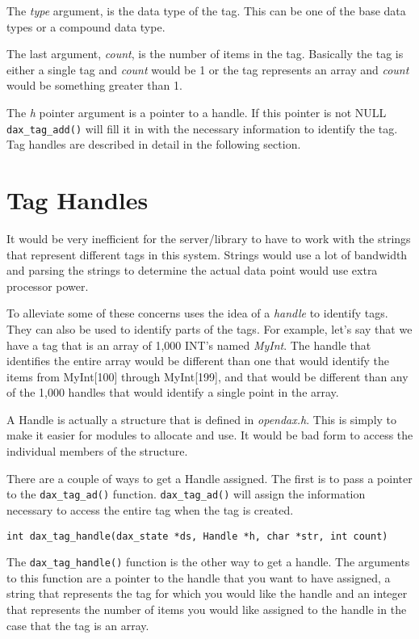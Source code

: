 The \emph{type} argument, is the data type of the tag.  This can be one of the base data types or a compound data type.

The  last argument, \emph{count}, is the number of items in the tag.  Basically the tag is either a single tag and \emph{count} would be 1 or the tag represents an array and \emph{count} would be something greater than 1.

The \emph{h} pointer argument is a pointer to a handle.  If this pointer is not NULL \verb|dax_tag_add()| will fill it in with the necessary information to identify the tag.  Tag handles are described in detail in the following section.

\section{Tag Handles}
It would be very inefficient for the server/library to have to work with the strings that represent different tags in this system.  Strings would use a lot of bandwidth and parsing the strings to determine the actual data point would use extra processor power.

To alleviate some of these concerns \opendax uses the idea of a \emph{handle} to identify tags.  They can also be used to identify parts of the tags.  For example, let's say that we have a tag that is an array of 1,000 INT's named \emph{MyInt}.  The handle that identifies the entire array would be different than one that would identify the items from MyInt[100] through MyInt[199], and that would be different than any of the 1,000 handles that would identify a single point in the array.

A Handle is actually a structure that is defined in \emph{opendax.h}.  This is simply to make it easier for modules to allocate and use.  It would be bad form to access the individual members of the structure.

There are a couple of ways to get a Handle assigned.  The first is to pass a pointer to the \verb|dax_tag_ad()| function.  \verb|dax_tag_ad()| will assign the information necessary to access the entire tag when the tag is created.

\verb|int dax_tag_handle(dax_state *ds, Handle *h, char *str, int count)|

The \verb|dax_tag_handle()| function  is the other way to get a handle.  The arguments to this function are a pointer to the handle that you want to have assigned, a string that represents the tag for which you would like the handle and an integer that represents the number of items you would like assigned to the handle in the case that the tag is an array.

